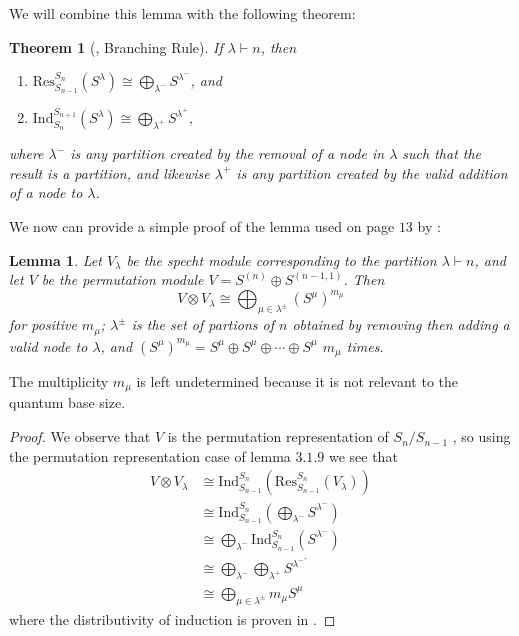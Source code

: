\documentclass[12pt,twoside]{reedthesis}
\theoremstyle{plain}   %
\newtheorem{thm}{Theorem}[section] %
\newtheorem{lemma}{Lemma}[section]
\theoremstyle{definition}
\theoremstyle{remark}
\numberwithin{equation}{section}
\def\ind{\mathrm{Ind}}
\def\res{\mathrm{Res}}
\begin{document}
  We will combine this lemma with the following theorem:
  \begin{thm}[{\cite[2.8.3]{sagan}, Branching Rule}]
    If $\lambda \vdash n$, then
    \begin{enumerate}
    \item $\res^{S_{n}}_{S_{n-1}} (S^\lambda) \cong \bigoplus_{\lambda^-} S^{\lambda^-}$, and
    \item $\ind^{S_{n+1}}_{S_{n}} (S^\lambda) \cong \bigoplus_{\lambda^+} S^{\lambda^+},$
    \end{enumerate}
    where $\lambda^-$ is any partition created by the removal of a node in $\lambda$ such that the result is a partition,
    and likewise $\lambda^+$ is any partition created by the valid addition of a node to $\lambda$.
  \end{thm}
  We now can provide a simple proof of the lemma used on page $13$ by \cite{copeland}:
  \begin{lemma}
    Let $V_\lambda$ be the specht module corresponding to the partition $\lambda \vdash n$, and let $V$ be the permutation module $V = S^{(n)} \oplus S^{(n-1,1)}$.
    Then
    \[V \otimes V_\lambda \cong \bigoplus_ {\mu \in \lambda^\pm} (S^\mu)^{m_\mu} \]
    for positive $m_\mu$; $\lambda^\pm$ is the set of partions of $n$ obtained by removing then adding a valid node to $\lambda$,
    and $(S^\mu)^{m_\mu} = S^\mu \oplus S^\mu \oplus \cdots \oplus S^\mu $ $m_\mu$ times.
  \end{lemma}
  The multiplicity $m_\mu$ is left undetermined because it is not relevant to the quantum base size.
  \begin{proof}
    We observe that $V$ is the permutation representation of $S_n / S_{n-1}$ , so using the permutation representation case of lemma $3.1.9$  we see that
    \begin{align*}
      V \otimes V_\lambda &\cong \ind^{S_{n}}_{S_{n-1}} ( \res^{S_{n}}_{S_{n-1}} (V_\lambda))\\
                          &\cong \ind^{S_{n}}_{S_{n-1}} (\bigoplus_{\lambda^-} S^{\lambda^-})\\
                          &\cong \bigoplus_{\lambda^-} \ind^{S_{n}}_{S_{n-1}} ( S^{\lambda^-}) \\
                          &\cong \bigoplus_{\lambda^-} \bigoplus_{\lambda^+} S^{\lambda^{-^+}} \\
                          &\cong \bigoplus_ {\mu \in \lambda^\pm} m_\mu S^\mu
    \end{align*}
    where the distributivity of induction is proven in \cite[Excercise 3.15]{fulton2004}.
  \end{proof}
\end{document}
